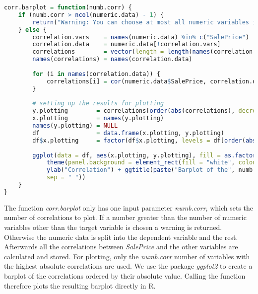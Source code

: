 \begin{lstlisting}[language=R]
corr.barplot = function(numb.corr) {
    if (numb.corr > ncol(numeric.data) - 1) {
        return("Warning: You can choose at most all numeric variables in the dataset except the target variable SalePrice, which is already implemented as default value")
    } else {
        correlation.vars    = names(numeric.data) %in% c("SalePrice")
        correlation.data    = numeric.data[!correlation.vars]                  # subsetting the numeric variables to not contain the target variable
        correlations        = vector(length = length(names(correlation.data))) # setting up vector for results (correlations)
        names(correlations) = names(correlation.data)
        
        for (i in names(correlation.data)) {                                   # calculating all bivariate correlations
            correlations[i] = cor(numeric.data$SalePrice, correlation.data[i], use = "pairwise.complete.obs")
        }
        
        # setting up the results for plotting
        y.plotting        = correlations[order(abs(correlations), decreasing = TRUE)][1:numb.corr]
        x.plotting        = names(y.plotting)
        names(y.plotting) = NULL
        df                = data.frame(x.plotting, y.plotting)
        df$x.plotting     = factor(df$x.plotting, levels = df[order(abs(df$y.plotting), decreasing = TRUE), "x.plotting"])
        
        ggplot(data = df, aes(x.plotting, y.plotting), fill = as.factor(x.plotting)) + geom_bar(stat = "identity", color = "black", fill = "black") + 
            theme(panel.background = element_rect(fill = "white", colour = "black"),axis.title.x = element_blank(), axis.text.x = element_text(angle = 90, vjust = 0.5, size = 12)) + 
            ylab("Correlation") + ggtitle(paste("Barplot of the", numb.corr, "highest bivariate correlations with SalePrice", 
            sep = " "))
    }
}
\end{lstlisting}
The function \textit{corr.barplot} only has one input parameter \textit{numb.corr}, which sets the number of correlations to plot. If a number greater than the number of numeric variables other than the target variable is chosen a warning is returned. Otherwise the numeric data is split into the dependent variable and the rest. Afterwards all the correlations between \textit{SalePrice} and the other variables are calculated and stored. For plotting, only the \textit{numb.corr} number of variables with the highest absolute correlations are used. We use the package \textit{ggplot2} to create a barplot of the  correlations ordered by their absolute value. Calling the function therefore plots the resulting barplot directly in \textsf{R}. \\
